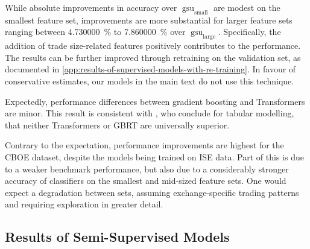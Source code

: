 While absolute improvements in accuracy over $\operatorname{gsu}_{\mathrm{small}}$ are modest on the smallest feature set, improvements are more substantial for larger feature sets ranging between \SI{4.730000}{\percent} to \SI{7.860000}{\percent} over $\operatorname{gsu}_{\mathrm{large}}$. Specifically, the addition of trade size-related features positively contributes to the performance. The results can be further improved through retraining on the validation set, as documented in \cref{app:results-of-supervised-models-with-re-training}. In favour of conservative estimates, our models in the main text do not use this technique.

Expectedly, performance differences between gradient boosting and Transformers are minor. This result is consistent with \textcites{grinsztajnWhyTreebasedModels2022}{gorishniyRevisitingDeepLearning2021}, who conclude for tabular modelling, that neither Transformers or \gls{GBRT} are universally superior.

Contrary to the expectation, performance improvements are highest for the \gls{CBOE} dataset, despite the models being trained on \gls{ISE} data. Part of this is due to a weaker benchmark performance, but also due to a considerably stronger accuracy of classifiers on the smallest and mid-sized feature sets. One would expect a degradation between sets, assuming exchange-specific trading patterns and requiring exploration in greater detail.


\subsection{Results of Semi-Supervised
    Models}\label{sec:results-of-semi-supervised-models}

